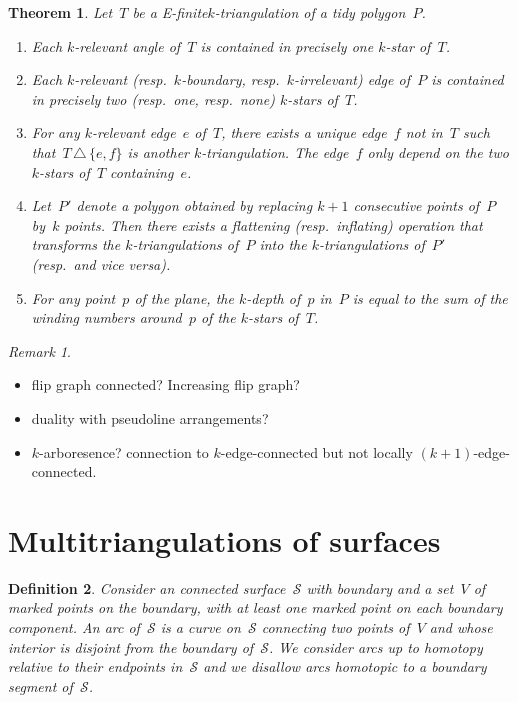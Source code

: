 \documentclass{amsart}
\newtheorem{theorem}{Theorem}[section]
\newtheorem{definition}[theorem]{Definition}
\theoremstyle{remark}
\newtheorem{remark}{Remark}[section]
\newcommand{\darkblue}{\color{darkblue}} %
\newcommand{\defn}[1]{\textsl{\darkblue #1}} %
\newcommand*{\ef}[0]{E-finite\xspace}
\newcommand*{\ktg}[0]{$k$-triangulation\xspace}
\newcommand{\surface}{\mathcal{S}}
\newcommand{\symdif}{\,\triangle\,} %
\newcommand{\viceversa}{\textit{vice versa}} %
\newcommand{\vincent}[1]{\todo[color=blue!30]{#1 \\ \hfill --- V.}}
\begin{document}
\begin{theorem}
\label{thm:structureInfinite}
Let~$T$ be a \ef \ktg of a tidy polygon~$P$.
\begin{enumerate}
\item Each $k$-relevant angle of~$T$ is contained in precisely one $k$-star of~$T$.
\item Each $k$-relevant (resp.~$k$-boundary, resp.~$k$-irrelevant) edge of~$P$ is contained in precisely two (resp.~one, resp.~none) $k$-stars of~$T$.
\item For any $k$-relevant edge~$e$ of~$T$, there exists a unique edge~$f$ not in~$T$ such that~$T \symdif \{e,f\}$ is another $k$-triangulation. The edge~$f$ only depend on the two $k$-stars of~$T$ containing~$e$.
\item Let~$P'$ denote a polygon obtained by replacing $k+1$ consecutive points of~$P$ by~$k$ points. Then there exists a flattening (resp.~inflating) operation that transforms the \ktg{}s of~$P$ into the \ktg{}s of~$P'$ (resp.~and \viceversa).
\item For any point~$p$ of the plane, the $k$-depth of~$p$ in~$P$ is equal to the sum of the winding numbers around~$p$ of the $k$-stars of~$T$.
\vincent{Vrai ?}
\end{enumerate}
\end{theorem}

\begin{remark}
\begin{itemize}
\item flip graph connected? Increasing flip graph?
\item duality with pseudoline arrangements?
\item $k$-arboresence? connection to $k$-edge-connected but not locally $(k+1)$-edge-connected.
\end{itemize}
\end{remark}

\section{Multitriangulations of surfaces}

\begin{definition}
Consider an connected surface~$\surface$ with boundary and a set~$V$ of marked points on the boundary, with at least one marked point on each boundary component. An \defn{arc} of~$\surface$ is a curve on~$\surface$ connecting two points of~$V$ and whose interior is disjoint from the boundary of~$\surface$. We consider arcs up to homotopy relative to their endpoints in~$\surface$ and we disallow arcs homotopic to a boundary segment of~$\surface$.
\end{definition}
\end{document}
